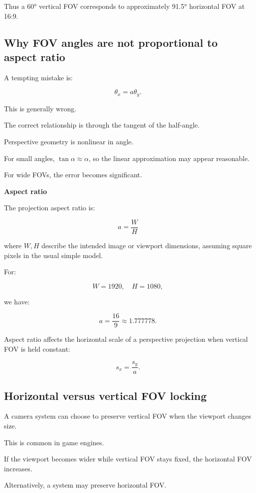 Thus a 60° vertical FOV corresponds to approximately 91.5° horizontal FOV at 16:9.

\subsection{Why FOV angles are not proportional to aspect ratio}\label{02-foundations-ii-ch033-why-fov-angles-are-not-proportional-to-aspect-ratio}

A tempting mistake is:

\[
 \theta_x=a\theta_y.
\]

This is generally wrong.

The correct relationship is through the tangent of the half-angle.

Perspective geometry is nonlinear in angle.

For small angles, \(\tan\alpha\approx\alpha\), so the linear approximation may appear reasonable.

For wide FOVs, the error becomes significant.

\textbf{Aspect ratio}

The projection aspect ratio is:

\[
 \boxed{ a=\frac WH }
\]

where \(W,H\) describe the intended image or viewport dimensions, assuming square pixels in the usual simple model.

For:

\[
 W=1920,\quad H=1080,
\]

we have:

\[
 \boxed{ a=\frac{16}{9}\approx1.777778 }.
\]

Aspect ratio affects the horizontal scale of a perspective projection when vertical FOV is held constant:

\[
 s_x=\frac{s_y}{a}.
\]

\subsection{Horizontal versus vertical FOV locking}\label{02-foundations-ii-ch033-horizontal-versus-vertical-fov-locking}

A camera system can choose to preserve vertical FOV when the viewport changes size.

This is common in game engines.

If the viewport becomes wider while vertical FOV stays fixed, the horizontal FOV increases.

Alternatively, a system may preserve horizontal FOV.

